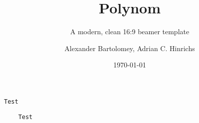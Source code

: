 \documentclass[fragile=singleslide]{beamer}
\title{Polynom}
\subtitle{A modern, clean 16:9 beamer template}
\author{Alexander Bartolomey, Adrian C. Hinrichs}
\date{\today}
\begin{document}
\begin{frame}[fragile]
  \texttt{Test}
  \begin{lstlisting}
    Test
  \end{lstlisting}
\end{frame}
\end{document}
